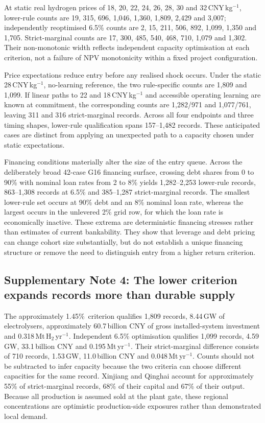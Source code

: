 \documentclass[11pt,a4paper]{article}
\newcommand{\lowhurdle}{approximately 1.45\%}
\begin{document}
At static real hydrogen prices of 18, 20, 22, 24, 26, 28, 30 and 32\,CNY\,kg$^{-1}$, lower-rule counts are 19, 315, 696, 1,046, 1,360, 1,809, 2,429 and 3,007; independently reoptimised 6.5\% counts are 2, 15, 211, 506, 892, 1,099, 1,350 and 1,705. Strict-marginal counts are 17, 300, 485, 540, 468, 710, 1,079 and 1,302. Their non-monotonic width reflects independent capacity optimisation at each criterion, not a failure of NPV monotonicity within a fixed project configuration.

Price expectations reduce entry before any realised shock occurs. Under the static 28\,CNY\,kg$^{-1}$, no-learning reference, the two rule-specific counts are 1,809 and 1,099. If linear paths to 22 and 18\,CNY\,kg$^{-1}$ and accessible operating learning are known at commitment, the corresponding counts are 1,282/971 and 1,077/761, leaving 311 and 316 strict-marginal records. Across all four endpoints and three timing shapes, lower-rule qualification spans 157--1,482 records. These anticipated cases are distinct from applying an unexpected path to a capacity chosen under static expectations.

Financing conditions materially alter the size of the entry queue. Across the deliberately broad 42-case G16 financing surface, crossing debt shares from 0 to 90\% with nominal loan rates from 2 to 8\% yields 1,282--2,253 lower-rule records, 863--1,308 records at 6.5\% and 385--1,287 strict-marginal records. The smallest lower-rule set occurs at 90\% debt and an 8\% nominal loan rate, whereas the largest occurs in the unlevered 2\% grid row, for which the loan rate is economically inactive. These extrema are deterministic financing stresses rather than estimates of current bankability. They show that leverage and debt pricing can change cohort size substantially, but do not establish a unique financing structure or remove the need to distinguish entry from a higher return criterion.

\subsection*{Supplementary Note 4: The lower criterion expands records more than durable supply}

The \lowhurdle\ criterion qualifies 1,809 records, 8.44\,GW of electrolysers, approximately 60.7\,billion CNY of gross installed-system investment and 0.318\,Mt\,H$_2$\,yr$^{-1}$. Independent 6.5\% optimisation qualifies 1,099 records, 4.59\,GW, 33.1\,billion CNY and 0.195\,Mt\,yr$^{-1}$. Their strict-marginal difference consists of 710 records, 1.53\,GW, 11.0\,billion CNY and 0.048\,Mt\,yr$^{-1}$. Counts should not be subtracted to infer capacity because the two criteria can choose different capacities for the same record. Xinjiang and Qinghai account for approximately 55\% of strict-marginal records, 68\% of their capital and 67\% of their output. Because all production is assumed sold at the plant gate, these regional concentrations are optimistic production-side exposures rather than demonstrated local demand.
\end{document}
